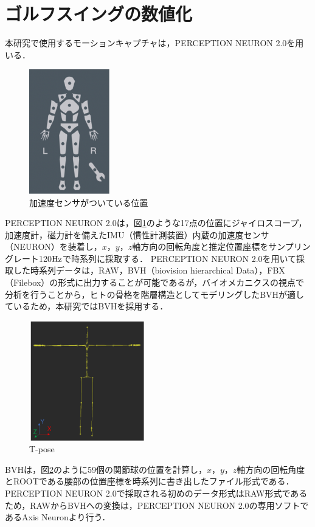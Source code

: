 \section{ゴルフスイングの数値化}
本研究で使用するモーションキャプチャは，PERCEPTION NEURON 2.0を用いる．
\begin{figure}
    \begin{center}
        \includegraphics[width=3.5cm]{./images/sensors.png}
        \caption{加速度センサがついている位置}
        \label{sensors}
    \end{center}
\end{figure}
PERCEPTION NEURON 2.0は，図\ref{sensors}のような17点の位置にジャイロスコープ，加速度計，磁力計を備えたIMU（慣性計測装置）内蔵の加速度センサ（NEURON）を装着し，$x$，$y$，$z$軸方向の回転角度と推定位置座標をサンプリングレート120$\rm{Hz}$で時系列に採取する．
PERCEPTION NEURON 2.0を用いて採取した時系列データは，RAW，BVH（biovision hierarchical Data），FBX（Filebox）の形式に出力することが可能であるが，バイオメカニクスの視点で分析を行うことから，ヒトの骨格を階層構造としてモデリングしたBVHが適しているため，本研究ではBVHを採用する．
\begin{figure}
    \begin{center}
        \includegraphics[width=5cm]{./images/Tpose.png}
        \caption{T-pose}
        \label{tpose}
    \end{center}
\end{figure}
BVHは，図\ref{tpose}のように59個の関節球の位置を計算し，$x$，$y$，$z$軸方向の回転角度とROOTである腰部の位置座標を時系列に書き出したファイル形式である．
PERCEPTION NEURON 2.0で採取される初めのデータ形式はRAW形式であるため，RAWからBVHへの変換は，PERCEPTION NEURON 2.0の専用ソフトであるAxis Neuronより行う．

